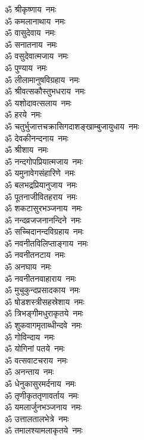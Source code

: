 \begin{multicols}{2}
\begin{flushleft}
ॐ श्रीकृष्णाय~नमः\\
ॐ कमलानाथाय~नमः\\
ॐ वासुदेवाय~नमः\\
ॐ सनातनाय~नमः\\
ॐ वसुदेवात्मजाय~नमः\\
ॐ पुण्याय~नमः\\
ॐ लीलामानुषविग्रहाय~नमः\\
ॐ श्रीवत्सकौस्तुभधराय~नमः\\
ॐ यशोदावत्सलाय~नमः\\
ॐ हरये~नमः\hfill{}\\
ॐ चतुर्भुजात्त\-चक्रासि\-गदाशङ्खाम्बुजायुधाय~नमः\\
ॐ देवकीनन्दनाय~नमः\\
ॐ श्रीशाय~नमः\\
ॐ नन्दगोपप्रियात्मजाय~नमः\\
ॐ यमुनावेगसंहारिणे~नमः\\
ॐ बलभद्रप्रियानुजाय~नमः\\
ॐ पूतनाजीवितहराय~नमः\\
ॐ शकटासुरभञ्जनाय~नमः\\
ॐ नन्दव्रजजनानन्दिने~नमः\\
ॐ सच्चिदानन्दविग्रहाय~नमः\hfill{}\\
ॐ नवनीतविलिप्ताङ्गाय~नमः\\
ॐ नवनीतनटाय~नमः\\
ॐ अनघाय~नमः\\
ॐ नवनीतनवाहाराय~नमः\\
ॐ मुचुकुन्दप्रसादकाय~नमः\\
ॐ षोडशस्त्रीसहस्रेशाय~नमः\\
ॐ त्रिभङ्गीमधुराकृतये~नमः\\
ॐ शुकवागमृताब्धीन्दवे~नमः\\
ॐ गोविन्दाय~नमः\\
ॐ योगिनां पतये~नमः\hfill{}\\
ॐ वत्सवाटचराय~नमः\\
ॐ अनन्ताय~नमः\\
ॐ धेनुकासुरमर्दनाय~नमः\\
ॐ तृणीकृततृणावर्ताय~नमः\\
ॐ यमलार्जुनभञ्जनाय~नमः\\
ॐ उत्तालतालभेत्रे~नमः\\
ॐ तमालश्यामलाकृतये~नमः\\

\end{flushleft}
\end{multicols}
